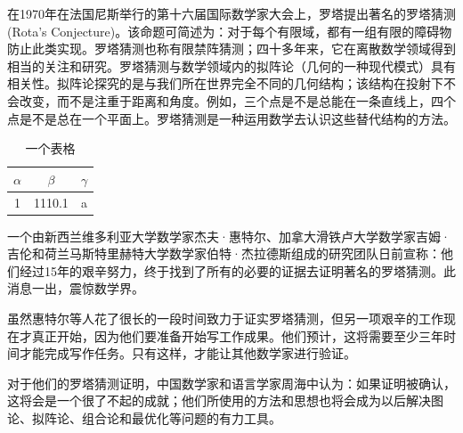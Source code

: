 \documentclass{CombPaper}
\begin{document}
在1970年在法国尼斯举行的第十六届国际数学家大会上，罗塔提出著名的罗塔猜测(Rota's Conjecture)。该命题可简述为：对于每个有限域，都有一组有限的障碍物防止此类实现。罗塔猜测也称有限禁阵猜测；四十多年来，它在离散数学领域得到相当的关注和研究。罗塔猜测与数学领域内的拟阵论（几何的一种现代模式）具有相关性。拟阵论探究的是与我们所在世界完全不同的几何结构；该结构在投射下不会改变，而不是注重于距离和角度。例如，三个点是不是总能在一条直线上，四个点是不是总在一个平面上。罗塔猜测是一种运用数学去认识这些替代结构的方法。

\begin{table}[h!]
	\begin{center}
		\caption{一个表格}
		\begin{tabular}{ccc}
			$\alpha$ & $\beta$ & $\gamma$ \\
			\hline
			1        & 1110.1  & a        \\
		\end{tabular}
	\end{center}
\end{table}

一个由新西兰维多利亚大学数学家杰夫·惠特尔、加拿大滑铁卢大学数学家吉姆·吉伦和荷兰马斯特里赫特大学数学家伯特·杰拉德斯组成的研究团队日前宣称：他们经过15年的艰辛努力，终于找到了所有的必要的证据去证明著名的罗塔猜测。此消息一出，震惊数学界。

虽然惠特尔等人花了很长的一段时间致力于证实罗塔猜测，但另一项艰辛的工作现在才真正开始，因为他们要准备开始写工作成果。他们预计，这将需要至少三年时间才能完成写作任务。只有这样，才能让其他数学家进行验证。

对于他们的罗塔猜测证明，中国数学家和语言学家周海中认为：如果证明被确认，这将会是一个很了不起的成就；他们所使用的方法和思想也将会成为以后解决图论、拟阵论、组合论和最优化等问题的有力工具。



\end{document}
